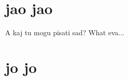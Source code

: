 \documentclass[twoside,12pt]{article}
\begin{document}
\newpage
\section{jao jao}
A kaj tu mogu pisati sad?
What eva...

%
\section{jo jo}
%


\restoregeometry
\end{document}
